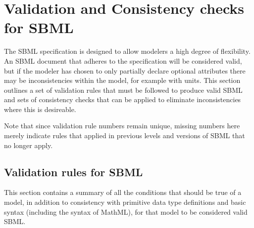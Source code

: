 
\newcommand{\sbmlrule}[1]{\item[#1.]}

\section{Validation and Consistency checks for SBML}
\label{apdx:validation-rules}

The SBML specification is designed to allow modelers a high degree
of flexibility.  An SBML document that adheres to the specification 
will be considered valid, but if the modeler has chosen to only
partially declare optional attributes there may be inconsistencies
within the model, for example with units.  This section outlines a 
set of validation rules that must be followed to produce valid SBML 
and sets of consistency checks that can be applied to eliminate  
inconsistencies where this is desireable.

Note that since validation rule numbers remain unique, missing numbers
here merely indicate rules that applied in previous levels and
versions of SBML that no longer apply.

\subsection{Validation rules for SBML}

This section contains a summary of all the conditions that should
be true of a model, in addition to consistency with primitive data
type definitions and basic syntax (including the syntax of
MathML), for that model to be considered valid SBML.


